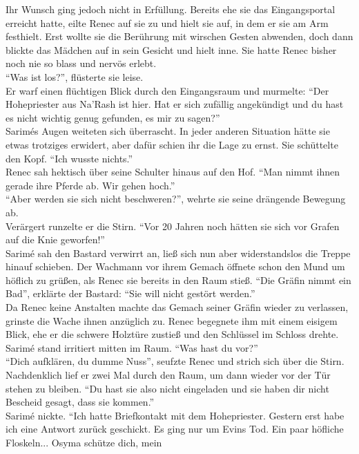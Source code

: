 Ihr Wunsch ging jedoch nicht in Erfüllung. Bereits ehe sie das Eingangsportal erreicht hatte, eilte 
Renec auf sie zu und hielt sie auf, in dem er sie am Arm festhielt. Erst wollte sie die Berührung 
mit wirschen Gesten abwenden, doch dann blickte das Mädchen auf in sein Gesicht und hielt inne. Sie 
hatte Renec bisher noch nie so blass und nervös erlebt. \\
``Was ist los?'', flüsterte sie leise.\\
Er warf einen flüchtigen Blick durch den Eingangsraum und murmelte: ``Der Hohepriester aus Na'Rash 
ist hier. Hat er sich zufällig angekündigt und du hast es nicht wichtig genug gefunden, es mir zu 
sagen?''\\
Sarimés Augen weiteten sich überrascht. In jeder anderen Situation hätte sie etwas trotziges 
erwidert, aber dafür schien ihr die Lage zu ernst. Sie schüttelte den Kopf. ``Ich wusste nichts.''\\
Renec sah hektisch über seine Schulter hinaus auf den Hof. ``Man nimmt ihnen gerade ihre Pferde ab. 
Wir gehen hoch.''\\
``Aber werden sie sich nicht beschweren?'', wehrte sie seine drängende Bewegung ab.\\
Verärgert runzelte er die Stirn. ``Vor 20 Jahren noch hätten sie sich vor Grafen auf die Knie 
geworfen!''\\
Sarimé sah den Bastard verwirrt an, ließ sich nun aber widerstandslos die Treppe hinauf schieben. 
Der Wachmann vor ihrem Gemach öffnete schon den Mund um höflich zu grüßen, als Renec sie bereits 
in den Raum stieß. ``Die Gräfin nimmt ein Bad'', erklärte der Bastard: 
``Sie will nicht gestört werden.''\\
Da Renec keine Anstalten machte das Gemach seiner Gräfin wieder zu verlassen, grinste die Wache 
ihnen anzüglich zu. Renec begegnete ihm mit einem eisigem Blick, ehe er die schwere Holztüre zustieß 
und den Schlüssel im Schloss drehte. \\
Sarimé stand irritiert mitten im Raum. ``Was hast du vor?''\\
``Dich aufklären, du dumme Nuss'', seufzte Renec und strich sich über die Stirn. Nachdenklich lief 
er zwei Mal durch den Raum, um dann wieder vor der Tür stehen zu bleiben. ``Du hast sie also nicht 
eingeladen und sie haben dir nicht Bescheid gesagt, dass sie kommen.''\\
Sarimé nickte. ``Ich hatte Briefkontakt mit dem Hohepriester. Gestern erst habe ich eine Antwort 
zurück geschickt. Es ging nur um Evins Tod. Ein paar höfliche Floskeln... Osyma schütze dich, mein 
